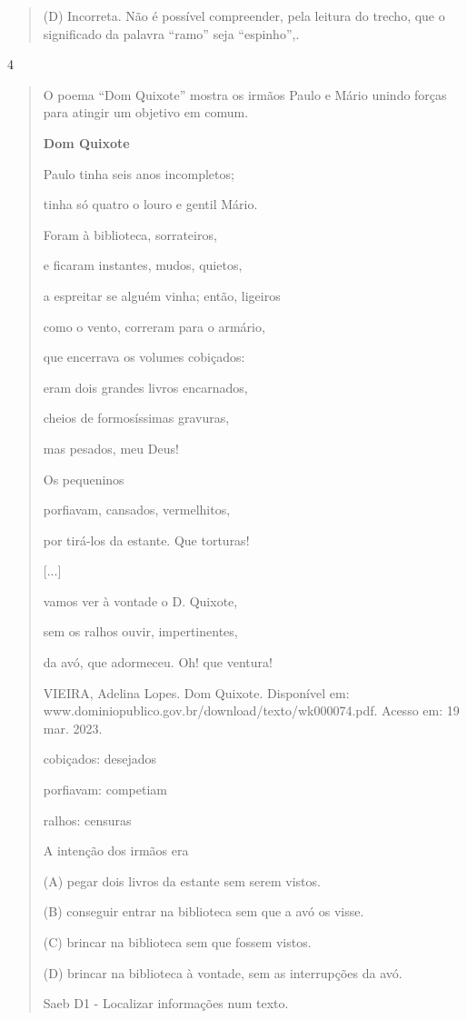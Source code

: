 \begin{escolha}
\begin{quote}
(D) Incorreta. Não é possível compreender, pela leitura do trecho, que o
significado da palavra ``ramo'' seja ``espinho'',.
\end{quote}

\num{4}

\begin{quote}
O poema ``Dom Quixote'' mostra os irmãos Paulo e Mário unindo forças
para atingir um objetivo em comum.

\textbf{Dom Quixote}

Paulo tinha seis anos incompletos;

tinha só quatro o louro e gentil Mário.

Foram à biblioteca, sorrateiros,

e ficaram instantes, mudos, quietos,

a espreitar se alguém vinha; então, ligeiros

como o vento, correram para o armário,

que encerrava os volumes cobiçados:

eram dois grandes livros encarnados,

cheios de formosíssimas gravuras,

mas pesados, meu Deus!

Os pequeninos

porfiavam, cansados, vermelhitos,

por tirá-los da estante. Que torturas!

{[}...{]}

vamos ver à vontade o D. Quixote,

sem os ralhos ouvir, impertinentes,

da avó, que adormeceu. Oh! que ventura!

VIEIRA, Adelina Lopes. Dom Quixote. Disponível em:
www.dominiopublico.gov.br/download/texto/wk000074.pdf. Acesso em: 19
mar. 2023.

cobiçados: desejados

porfiavam: competiam

ralhos: censuras

A intenção dos irmãos era

(A) pegar dois livros da estante sem serem vistos.

(B) conseguir entrar na biblioteca sem que a avó os visse.

(C) brincar na biblioteca sem que fossem vistos.

(D) brincar na biblioteca à vontade, sem as interrupções da avó.

Saeb D1 - Localizar informações num texto.


\end{quote}
\end{escolha}

